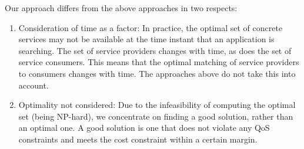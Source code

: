 \documentclass[10pt,journal,compsoc]{IEEEtran}
\begin{document}
Our approach differs from the above approaches in two respects:
 \begin{enumerate}
     \item Consideration of time as a factor: In practice, the optimal set of concrete services may not be available at the time instant that an application is searching. The set of service providers changes with time, as does the set of service consumers. This means that the optimal matching of service providers to consumers changes with time. The approaches above do not take this into account.
     \item Optimality not considered: Due to the infeasibility of computing the optimal set (being NP-hard), we concentrate on finding a good solution, rather than an optimal one. A good solution is one that does not violate any QoS constraints and meets the cost constraint within a certain margin.
 \end{enumerate}
\end{document}
